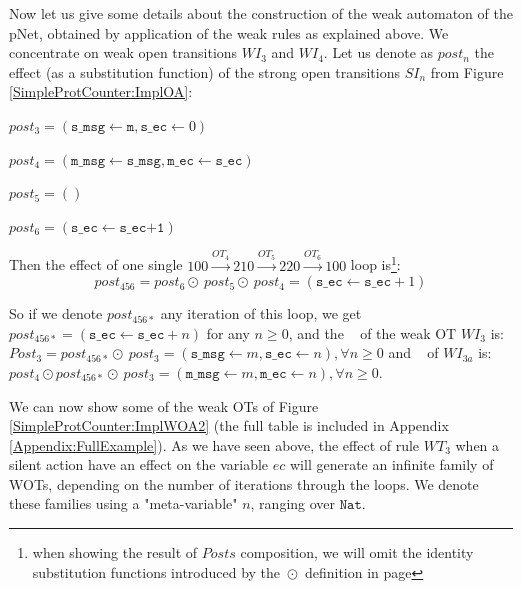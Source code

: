 \documentclass{elsarticle}
\newcommand{\TODO}[1]{\textcolor{red}{\textbf{[TODO:#1]}}}
\newcommand{\shortodot}{\!\odot\!}
\begin{document}
Now let us give some details about the construction of the weak automaton of the  pNet, obtained by application of the weak rules as explained above. We concentrate on weak open transitions $WI_3$ and $WI_4$. Let us denote as $post_n$ the effect (as a substitution function) of the strong open transitions $SI_n$ from Figure \ref{SimpleProtCounter:ImplOA}:
\smallskip

$post_3 = (\texttt{s\_msg}\gets \texttt{m}, \texttt{s\_ec}\gets 0)$

$post_4 = (\texttt{m\_msg}\gets \texttt{s\_msg}, \texttt{m\_ec}\gets \texttt{s\_ec})$

$post_5 = ()$

$post_6 = (\texttt{s\_ec}\gets \texttt{s\_ec+1})$

\medskip

Then the effect of one single $100 \xrightarrow{OT_4} 210 \xrightarrow{OT_5} 220 \xrightarrow{OT_6} 100$ loop is\footnote{when showing  the result of $Posts$ composition, we will omit the identity substitution functions introduced by the $\shortodot$ definition in page \pageref{def:substitutions}}:
\[post_{456} = post_6 \shortodot\ post_5 \shortodot\ post_4
= (\texttt{s\_ec}\gets \texttt{s\_ec}+1)\]

So if we denote ${post_{456*}}$ any iteration of this loop, we get ${post_{456*}} = (\texttt{s\_ec}\gets \texttt{s\_ec}+n)$ for any $n\ge 0$, and the \Post~ of the weak OT  $WI_{3}$ is:\\
 $Post_3 = post_{456*}\shortodot\ post_3 = (\texttt{s\_msg}\gets m, \texttt{s\_ec}\gets n), \forall n\ge 0$ and \Post~ of  $WI_{3a}$  is:\\ $post_4\shortodot {post_{456*}}\shortodot\ post_3 = (\texttt{m\_msg}\gets m, \texttt{m\_ec}\gets n), \forall n\ge 0$.
\medskip

We can now show some of the weak OTs of Figure \ref{SimpleProtCounter:ImplWOA2} (the full table is included in Appendix \ref{Appendix:FullExample}).
As we have seen above, the effect of rule $WT_3$ when a silent action have an effect on the variable $ec$ will generate an infinite family of WOTs, depending on the number of iterations through the loops. We denote these families using a "meta-variable" $n$, ranging over $\texttt{Nat}$.
\smallskip
\end{document}
